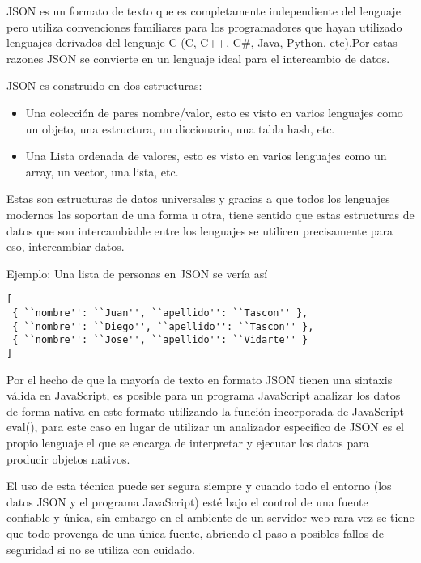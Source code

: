 JSON es un formato de texto que es completamente independiente del lenguaje pero utiliza convenciones familiares para los programadores que hayan utilizado lenguajes derivados del lenguaje C (C, C++, C\#, Java, Python, etc).\newline Por estas razones JSON se convierte en un lenguaje ideal para el intercambio de datos.

JSON es construido en dos estructuras:

\begin{itemize}

	\item Una colección de pares nombre/valor, esto es visto en varios lenguajes como un objeto, una estructura, un diccionario, una tabla hash, etc.
	
	\item Una Lista ordenada de valores, esto es visto en varios lenguajes como un array, un vector, una lista, etc.

\end{itemize}

Estas son estructuras de datos universales y gracias a que todos los lenguajes modernos las soportan de una forma u otra, tiene sentido que estas estructuras de datos que son intercambiable entre los lenguajes se utilicen precisamente para eso, intercambiar datos.

Ejemplo: Una lista de personas en JSON se vería así

\begin{verbatim}
[
 { ``nombre'': ``Juan'', ``apellido'': ``Tascon'' },
 { ``nombre'': ``Diego'', ``apellido'': ``Tascon'' },
 { ``nombre'': ``Jose'', ``apellido'': ``Vidarte'' }
]
\end{verbatim}

Por el hecho de que la mayoría de texto en formato JSON tienen una sintaxis válida en JavaScript, es posible para un programa JavaScript analizar los datos de forma nativa en este formato utilizando la función incorporada de JavaScript eval(), para este caso en lugar de utilizar un analizador especifico de JSON es el propio lenguaje el que se encarga de interpretar y ejecutar los datos para producir objetos nativos.

El uso de esta técnica puede ser segura siempre y cuando todo el entorno (los datos JSON y el programa JavaScript) esté bajo el control de una fuente confiable y única, sin embargo en el ambiente de un servidor web rara vez se tiene que todo provenga de una única fuente, abriendo el paso a posibles fallos de seguridad si no se utiliza con cuidado.

